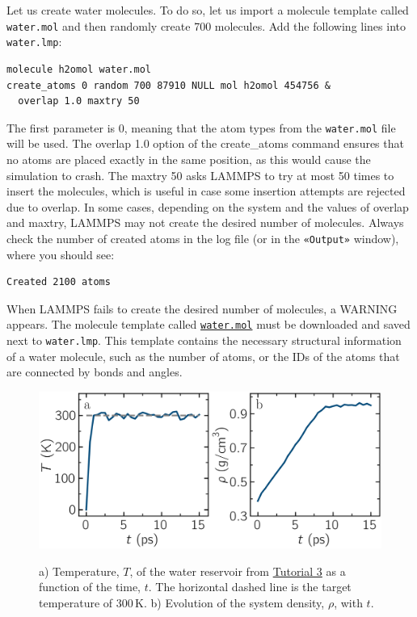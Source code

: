 \documentclass[9pt,tutorial]{livecoms}
\newcommand{\lmpcmd}[1]{\colorbox{listing}{\textcolor{command}{\small{#1}}}} %
\newcommand{\flecmd}[1]{\textcolor{command}{\texttt{#1}}} %
\newcommand{\guicmd}[1]{\textcolor{command}{\texttt{«#1»}}} %
\newcommand{\dwlcmd}[1]{\textcolor{download}{\texttt{#1}}} %
\newcommand{\filepath}{https://raw.githubusercontent.com/lammpstutorials/lammpstutorials-article/main/files/}
\begin{document}
\noindent Let us create water molecules.  To do so, let us import a molecule template called
\flecmd{water.mol} and then randomly create 700 molecules.  Add the following
lines into \flecmd{water.lmp}:
\begin{lstlisting}
molecule h2omol water.mol
create_atoms 0 random 700 87910 NULL mol h2omol 454756 &
  overlap 1.0 maxtry 50
\end{lstlisting}
The first parameter is 0, meaning that the atom types from
the \flecmd{water.mol} file will be used.
The \lmpcmd{overlap 1.0} option of the \lmpcmd{create\_atoms} command ensures
that no atoms are placed exactly in the same position, as this would cause the
simulation to crash.  The \lmpcmd{maxtry 50} asks LAMMPS to try at most 50 times
to insert the molecules, which is useful in case some insertion attempts are
rejected due to overlap.  In some cases, depending on the system and the values
of \lmpcmd{overlap} and \lmpcmd{maxtry}, LAMMPS may not create the desired number
of molecules.  Always check the number of created atoms in the \lmpcmd{log} file
(or in the \guicmd{Output} window), where you should see:
\begin{lstlisting}
Created 2100 atoms
\end{lstlisting}
When LAMMPS fails to create the desired number of molecules, a WARNING
appears.  The molecule template called
%
\href{\filepath tutorial3/water.mol}{\dwlcmd{water.mol}}
%
must be downloaded and saved
next to \flecmd{water.lmp}.  This template contains the necessary
structural information of a water molecule, such as the number of atoms,
or the IDs of the atoms that are connected by bonds and angles.

\begin{figure}
\centering
\includegraphics[width=\linewidth]{PEG-density}\\[-2ex]
\caption{a) Temperature, $T$, of the water reservoir from \hyperref[all-atom-label]{Tutorial 3}
as a function of the time, $t$.  The horizontal dashed line is the target temperature of 300\,K.
b) Evolution of the system density, $\rho$, with $t$.}
\label{fig:PEG-density}
\end{figure}
\end{document}
